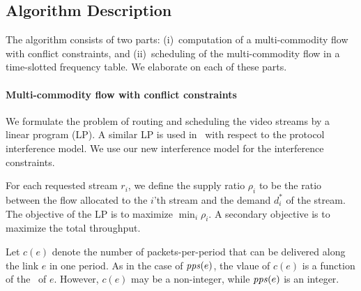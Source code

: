 \documentclass[12pt]{article}
\newenvironment{proof sketch}[1]{\noindent {\emph{Proof sketch of #1:}}}{\hfill \qed}
\newcommand{\pps}{\text{\emph{pps}}}
\newcommand{\MCS}{\text{\sc{mcs}}}
\begin{document}
\subsection{Algorithm Description}
The algorithm consists of two parts: (i)~computation of a
multi-commodity flow with conflict constraints, and (ii)~scheduling of
the multi-commodity flow in a time-slotted frequency table.
We elaborate on each of these parts.

\paragraph{Multi-commodity flow with conflict constraints}
We formulate the problem of routing and scheduling the video streams
by a linear program (LP).  A similar LP is used
in~\cite{alicherry2005joint11,buragohain2007improved} with respect to
the protocol interference model.  We use our new interference model
for the interference constraints.

For each requested stream $r_i$, we define the supply ratio $\rho_i$
to be the ratio between the flow allocated to the $i$'th stream and
the demand $d^*_i$ of the stream.  The objective of the LP is to
maximize $\min_i \rho_i$.  A secondary objective is to maximize the
total throughput.

Let $c(e)$ denote the number of packets-per-period that can be
delivered along the link $e$ in one period.  As in the case of
$\pps(e)$, the vlaue of $c(e)$ is a function of the \MCS\ of $e$.
However, $c(e)$ may be a non-integer, while $\pps(e)$ is an integer.
\end{document}
